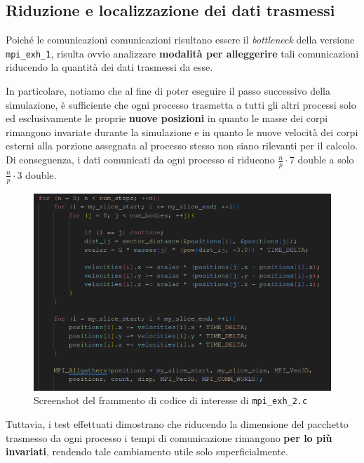 \documentclass[12pt]{report}
\begin{document}
    \newpage

    \subsection{Riduzione e localizzazione dei dati trasmessi}

    Poiché le comunicazioni comunicazioni risultano essere il \textit{bottleneck} della versione \texttt{mpi\_exh\_1}, risulta ovvio analizzare \textbf{modalità per alleggerire} tali comunicazioni riducendo la quantità dei dati trasmessi da esse.
    
    In particolare, notiamo che al fine di poter eseguire il passo successivo della simulazione, è sufficiente che ogni processo trasmetta a tutti gli altri processi solo ed esclusivamente le proprie \textbf{nuove posizioni} in quanto le masse dei corpi rimangono invariate durante la simulazione e in quanto le nuove velocità dei corpi esterni alla porzione assegnata al processo stesso non siano rilevanti per il calcolo. Di conseguenza, i dati comunicati da ogni processo si riducono $\frac{n}{p} \cdot 7$ double a solo $\frac{n}{p} \cdot 3$ double.

    \begin{figure}[H]
        \centering
        \includegraphics[width=\textwidth]{images/mpi_exh_2.png}
        \caption{Screenshot del frammento di codice di interesse di \texttt{mpi\_exh\_2.c}}
        \label{fig:mpi_exh_2}
    \end{figure}
    
    Tuttavia, i test effettuati dimostrano che riducendo la dimensione del pacchetto trasmesso da ogni processo i tempi di comunicazione rimangono \textbf{per lo più invariati}, rendendo tale cambiamento utile solo superficialmente.
\end{document}

